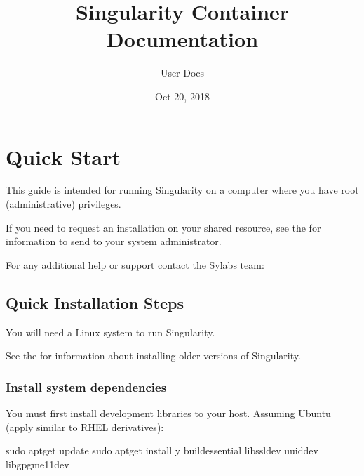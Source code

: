 \documentclass[letterpaper,10pt,english]{sphinxmanual}
\title{Singularity Container Documentation}
\date{Oct 20, 2018}
\author{User Docs}
\begin{document}
\maketitle
\sphinxtableofcontents
{}\label{\detokenize{index::doc}}



\chapter{Quick Start}
\label{\detokenize{quick_start:quick-start}}\label{\detokenize{quick_start:id1}}\label{\detokenize{quick_start::doc}}\label{\detokenize{quick_start:sec-quickstart}}
This guide is intended for running Singularity on a computer where you
have root (administrative) privileges.

If you need to request an installation on your shared resource, see the
 for
information to send to your system administrator.

For any additional help or support contact the Sylabs team:


\section{Quick Installation Steps}
\label{\detokenize{quick_start:quick-installation-steps}}\label{\detokenize{quick_start:quick-installation}}
You will need a Linux system to run Singularity.

See the  for information about installing
older versions of Singularity.


\subsection{Install system dependencies}
\label{\detokenize{quick_start:install-system-dependencies}}
You must first install development libraries to your host. Assuming Ubuntu
(apply similar to RHEL derivatives):

%
\begin{sphinxVerbatim}[commandchars=\\\{\}]
\PYGZdl{} sudo apt\PYGZhy{}get update \PYGZam{}\PYGZam{} sudo apt\PYGZhy{}get install \PYGZhy{}y \PYGZbs{}
    build\PYGZhy{}essential \PYGZbs{}
    libssl\PYGZhy{}dev \PYGZbs{}
    uuid\PYGZhy{}dev \PYGZbs{}
    libgpgme11\PYGZhy{}dev
\end{sphinxVerbatim}
\end{document}
